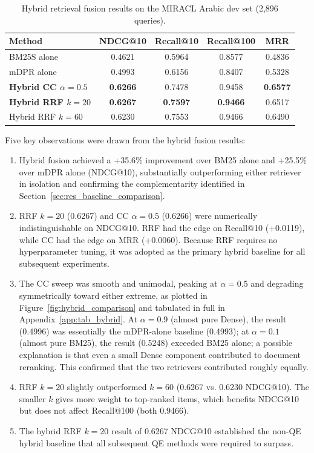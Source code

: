\begin{table}[htbp]
    \centering
    \caption[Hybrid retrieval fusion results]{Hybrid retrieval fusion results on the MIRACL Arabic dev set (2,896 queries).}
    \label{tab:hybrid_results}
    \begin{tabular}{@{}lcccc@{}}
        \toprule
        \textbf{Method} & \textbf{NDCG@10} & \textbf{Recall@10} & \textbf{Recall@100} & \textbf{MRR} \\
        \midrule
        BM25S alone & 0.4621 & 0.5964 & 0.8577 & 0.4836 \\
        mDPR alone & 0.4993 & 0.6156 & 0.8407 & 0.5328 \\
        \midrule
        \textbf{Hybrid CC $\alpha=0.5$} & \textbf{0.6266} & 0.7478 & 0.9458 & \textbf{0.6577} \\
        \midrule
        \textbf{Hybrid RRF $k=20$} & \textbf{0.6267} & \textbf{0.7597} & \textbf{0.9466} & 0.6517 \\
        Hybrid RRF $k=60$ & 0.6230 & 0.7553 & 0.9466 & 0.6490 \\
        \bottomrule
    \end{tabular}
\end{table}

Five key observations were drawn from the hybrid fusion results:

\begin{enumerate}
    \item Hybrid fusion achieved a +35.6\% improvement over BM25 alone and +25.5\% over mDPR alone (NDCG@10), substantially outperforming either retriever in isolation and confirming the complementarity identified in Section~\ref{sec:res_baseline_comparison}.

    \item RRF $k=20$ (0.6267) and CC $\alpha=0.5$ (0.6266) were numerically indistinguishable on NDCG@10. RRF had the edge on Recall@10 (+0.0119), while CC had the edge on MRR (+0.0060). Because RRF requires no hyperparameter tuning, it was adopted as the primary hybrid baseline for all subsequent experiments.

    \item The CC sweep was smooth and unimodal, peaking at $\alpha=0.5$ and degrading symmetrically toward either extreme, as plotted in Figure~\ref{fig:hybrid_comparison} and tabulated in full in Appendix~\ref{app:tab_hybrid}. At $\alpha=0.9$ (almost pure Dense), the result (0.4996) was essentially the mDPR-alone baseline (0.4993); at $\alpha=0.1$ (almost pure BM25), the result (0.5248) exceeded BM25 alone; a possible explanation is that even a small Dense component contributed to document reranking. This confirmed that the two retrievers contributed roughly equally.

    \item RRF $k=20$ slightly outperformed $k=60$ (0.6267 vs. 0.6230 NDCG@10). The smaller $k$ gives more weight to top-ranked items, which benefits NDCG@10 but does not affect Recall@100 (both 0.9466).

    \item The hybrid RRF $k=20$ result of 0.6267 NDCG@10 established the non-QE hybrid baseline that all subsequent QE methods were required to surpass.
\end{enumerate}

